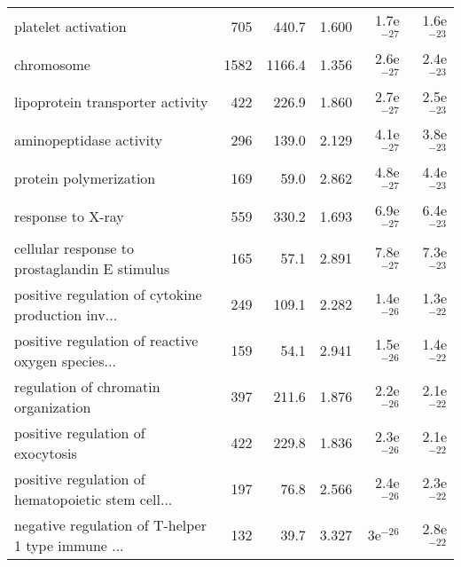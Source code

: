\begin{longtable}{lrrrrr}
                               platelet activation &                     705 &                   440.7 &      1.600 &         1.7e$^{-27}$ &         1.6e$^{-23}$ \\
                                        chromosome &                    1582 &                  1166.4 &      1.356 &         2.6e$^{-27}$ &         2.4e$^{-23}$ \\
                  lipoprotein transporter activity &                     422 &                   226.9 &      1.860 &         2.7e$^{-27}$ &         2.5e$^{-23}$ \\
                           aminopeptidase activity &                     296 &                   139.0 &      2.129 &         4.1e$^{-27}$ &         3.8e$^{-23}$ \\
                            protein polymerization &                     169 &                    59.0 &      2.862 &         4.8e$^{-27}$ &         4.4e$^{-23}$ \\
                                 response to X-ray &                     559 &                   330.2 &      1.693 &         6.9e$^{-27}$ &         6.4e$^{-23}$ \\
     cellular response to prostaglandin E stimulus &                     165 &                    57.1 &      2.891 &         7.8e$^{-27}$ &         7.3e$^{-23}$ \\
 positive regulation of cytokine production inv... &                     249 &                   109.1 &      2.282 &         1.4e$^{-26}$ &         1.3e$^{-22}$ \\
 positive regulation of reactive oxygen species... &                     159 &                    54.1 &      2.941 &         1.5e$^{-26}$ &         1.4e$^{-22}$ \\
              regulation of chromatin organization &                     397 &                   211.6 &      1.876 &         2.2e$^{-26}$ &         2.1e$^{-22}$ \\
                 positive regulation of exocytosis &                     422 &                   229.8 &      1.836 &         2.3e$^{-26}$ &         2.1e$^{-22}$ \\
 positive regulation of hematopoietic stem cell... &                     197 &                    76.8 &      2.566 &         2.4e$^{-26}$ &         2.3e$^{-22}$ \\
 negative regulation of T-helper 1 type immune ... &                     132 &                    39.7 &      3.327 &           3e$^{-26}$ &         2.8e$^{-22}$ \\

\end{longtable}
